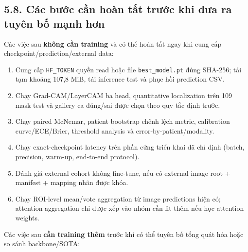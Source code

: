 \documentclass[
  10pt,
  a4paper,
  twocolumn]{article}
\providecommand{\tightlist}{%
  \setlength{\itemsep}{0pt}\setlength{\parskip}{0pt}}
\begin{document}
\subsection{5.8. Các bước cần hoàn tất trước khi đưa ra tuyên bố mạnh
hơn}\label{cuxe1c-bux1b0ux1edbc-cux1ea7n-houxe0n-tux1ea5t-trux1b0ux1edbc-khi-ux111ux1b0a-ra-tuyuxean-bux1ed1-mux1ea1nh-hux1a1n}

Các việc sau \textbf{không cần training} và có thể hoàn tất ngay khi
cung cấp checkpoint/prediction/external data:

\begin{enumerate}
\def\labelenumi{\arabic{enumi}.}
\tightlist
\item
  Cung cấp \texttt{HF\_TOKEN} quyền read hoặc file
  \texttt{best\_model.pt} đúng SHA-256; tải tạm khoảng 107,8 MiB, tái
  inference test và phục hồi prediction CSV.
\item
  Chạy Grad-CAM/LayerCAM ba head, quantitative localization trên 109
  mask test và gallery ca đúng/sai được chọn theo quy tắc định trước.
\item
  Chạy paired McNemar, patient bootstrap chênh lệch metric, calibration
  curve/ECE/Brier, threshold analysis và error-by-patient/modality.
\item
  Chạy exact-checkpoint latency trên phần cứng triển khai đã chỉ định
  (batch, precision, warm-up, end-to-end protocol).
\item
  Đánh giá external cohort không fine-tune, nếu có external image root +
  manifest + mapping nhãn được khóa.
\item
  Chạy ROI-level mean/vote aggregation từ image predictions hiện có;
  attention aggregation chỉ được xếp vào nhóm cần fit thêm nếu học
  attention weights.
\end{enumerate}

Các việc sau \textbf{cần training thêm} trước khi có thể tuyên bố tổng
quát hóa hoặc so sánh backbone/SOTA:
\end{document}
